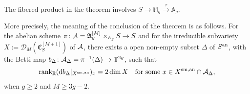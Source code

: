 The fibered product in the theorem involves
$S\rightarrow\mathbb{M}_g\xrightarrow{\tau} \mathbb{A}_g$.

More precisely, the meaning of the conclusion of the theorem is as follows. For the abelian scheme $\pi \colon \mathcal{A} = \mathfrak{A}_g^{[M]} \times_{\mathbb{A}_g}S \rightarrow S$ and for the irreducible subvariety $X:=\mathscr{D}_M( \mathfrak{C}_S^{[M+1]} )$ of $\mathcal{A}$, there exists a open non-empty subset $\Delta$ of ${S}^{\mathrm{an}}$, with the Betti map $b_{\Delta} \colon \mathcal{A}_{\Delta} = \pi^{-1}(\Delta) \rightarrow \mathbb{T}^{2g}$, such that 
\begin{equation}\label{EqNonDegXDMC}
\mathrm{rank}_{{\mathbb{R}}} (\mathrm{d}b_{\Delta}|_{{X}^{\mathrm{sm,an}}})_x = 2\dim X\quad \text{for some }x \in {X}^{\mathrm{sm,an}} \cap \mathcal{A}_{\Delta},
\end{equation}
when $g \ge 2$ and $M \ge 3g-2$.



